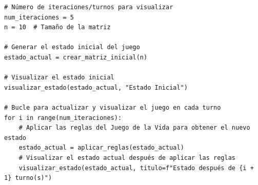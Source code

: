 \begin{enumerate}
\begin{itemize}
   \begin{lstlisting}
# Número de iteraciones/turnos para visualizar
num_iteraciones = 5
n = 10  # Tamaño de la matriz

# Generar el estado inicial del juego
estado_actual = crear_matriz_inicial(n)

# Visualizar el estado inicial
visualizar_estado(estado_actual, "Estado Inicial")

# Bucle para actualizar y visualizar el juego en cada turno
for i in range(num_iteraciones):
    # Aplicar las reglas del Juego de la Vida para obtener el nuevo estado
    estado_actual = aplicar_reglas(estado_actual)
    # Visualizar el estado actual después de aplicar las reglas
    visualizar_estado(estado_actual, titulo=f"Estado después de {i + 1} turno(s)")
\end{lstlisting}


\end{itemize}
\end{enumerate}
